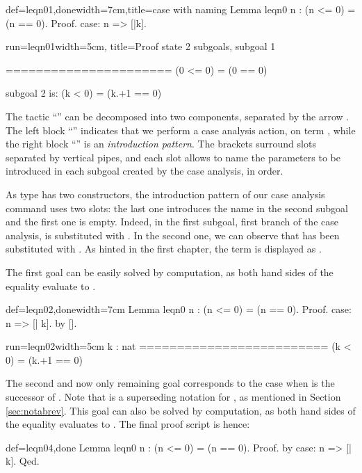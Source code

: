 \begin{coq}{def=leqn01,done}{width=7cm,title=case with naming}
Lemma leqn0 n : (n <= 0) = (n == 0).
Proof.
case: n => [|k].
\end{coq}
\begin{coqout}{run=leqn01}{width=5cm, title=Proof state}
2 subgoals, subgoal 1

======================
  (0 <= 0) = (0 == 0)

subgoal 2 is:
 (k < 0) = (k.+1 == 0)
\end{coqout}
The tactic ``''  can be decomposed into two components,
separated by the arrow \C{=>}.  The left block ``'' indicates
that we  perform a case analysis action, on term , while the right
block ``\C{[|k]}'' is an \emph{introduction pattern}. The brackets
surround slots separated by vertical pipes, and each slot allows to
name the parameters to be introduced in each subgoal created by the
case analysis, in order.

As type  has two constructors, the introduction pattern \C{[|k]}
of our case analysis command uses two slots: the last one introduces
the name  in the second subgoal and the first one is
empty. Indeed, in the first subgoal, first branch of the case
analysis,  is substituted with . In the second one, we can
observe that  has been substituted with .
As hinted in the first chapter, the term 
is displayed as .

The first goal
can be easily solved by computation, as both hand sides of the equality
evaluate to .

\begin{coq}{def=leqn02,done}{width=7cm}
Lemma leqn0 n : (n <= 0) = (n == 0).
Proof.
case: n => [| k].
  by [].
\end{coq}
\begin{coqout}{run=leqn02}{width=5cm}
k : nat
=========================
  (k < 0) = (k.+1 == 0)
\end{coqout}
The second and now only remaining goal corresponds to the case when
 is the successor of . Note that  is a
superseding notation for , as mentioned in Section
\ref{sec:notabrev}. This goal can also be  solved by computation, as
both hand sides of the equality evaluates to .  The final
proof script is hence:

\begin{coq}{def=leqn04,done}{}
Lemma leqn0 n : (n <= 0) = (n == 0).
Proof.  by case: n => [| k].  Qed.
\end{coq}
~\\


